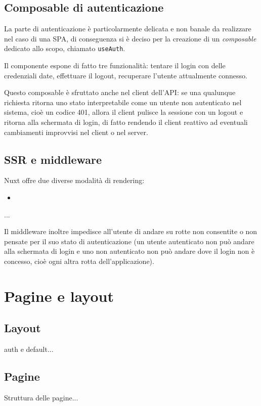 \subsection{Composable di autenticazione}
La parte di autenticazione è particolarmente delicata e non banale da realizzare nel caso di una SPA, di conseguenza si è deciso per la creazione di un \emph{composable} dedicato allo scopo, chiamato \texttt{useAuth}.

Il componente espone di fatto tre funzionalità: tentare il login con delle credenziali date, effettuare il logout, recuperare l'utente attualmente connesso.

Questo composable è sfruttato anche nel client dell'API: se una qualunque richiesta ritorna uno stato interpretabile come un utente non autenticato nel sistema, cioè un codice 401, allora il client pulisce la sessione con un logout e ritorna alla schermata di login, di fatto rendendo il client reattivo ad eventuali cambiamenti improvvisi nel client o nel server.

\subsection{SSR e middleware}
Nuxt offre due diverse modalità di rendering:
\begin{itemize}
    \item 
\end{itemize}

...

Il middleware inoltre impedisce all'utente di andare su rotte non consentite o non pensate per il suo stato di autenticazione (un utente autenticato non può andare alla schermata di login e uno non autenticato non può andare dove il login non è concesso, cioè ogni altra rotta dell'applicazione).

\section{Pagine e layout}

\subsection{Layout}
auth e default...

\subsection{Pagine}
Struttura delle pagine...


